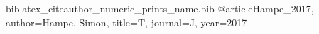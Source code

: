 \begin{filecontents*}{biblatex_citeauthor_numeric_prints_name.bib}
@article{Hampe_2017, author={Hampe, Simon}, title={T}, journal={J}, year={2017}}
\end{filecontents*}
\documentclass{article}
\usepackage[style=numeric]{biblatex}


\citeauthor{Hampe_2017} showed it.
\textcite{Hampe_2017} showed it too.
\printbibliography

